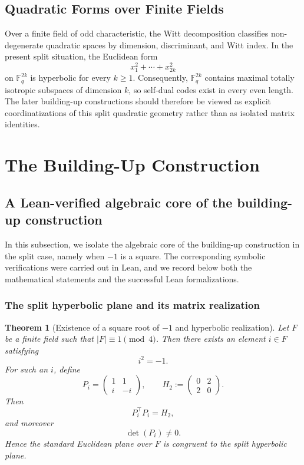 \documentclass[12pt]{article}
\newtheorem{theorem}{Theorem}[section]
\newcommand{\F}{\mathbb{F}}
\begin{document}
\subsection{Quadratic Forms over Finite Fields}

Over a finite field of odd characteristic, the Witt decomposition classifies non-degenerate quadratic spaces by dimension, discriminant, and Witt index. In the present split situation, the Euclidean form
\[
x_1^2+\cdots+x_{2k}^2
\]
on $\F_q^{2k}$ is hyperbolic for every $k \ge 1$. Consequently, $\F_q^{2k}$ contains maximal totally isotropic subspaces of dimension $k$, so self-dual codes exist in every even length. The later building-up constructions should therefore be viewed as explicit coordinatizations of this split quadratic geometry rather than as isolated matrix identities.


\section{The Building-Up Construction}
\label{sec:building-up}

\subsection{A Lean-verified algebraic core of the building-up construction}

In this subsection, we isolate the algebraic core of the building-up construction in the split case, namely when $-1$ is a square. The corresponding symbolic verifications were carried out in Lean, and we record below both the mathematical statements and the successful Lean formalizations.

\subsubsection{The split hyperbolic plane and its matrix realization}

\begin{theorem}[Existence of a square root of $-1$ and hyperbolic realization]
\label{thm:hyperbolic-realization}
Let $F$ be a finite field such that $|F| \equiv 1 \pmod 4$. Then there exists an element $i \in F$ satisfying
\[
i^2 = -1.
\]
For such an $i$, define
\[
P_i =
\begin{pmatrix}
1 & 1\\
i & -i
\end{pmatrix},
\qquad
H_2 :=
\begin{pmatrix}
0 & 2\\
2 & 0
\end{pmatrix}.
\]
Then
\[
P_i^{\top} P_i = H_2,
\]
and moreover
\[
\det(P_i) \neq 0.
\]
Hence the standard Euclidean plane over $F$ is congruent to the split hyperbolic plane.
\end{theorem}
\end{document}
